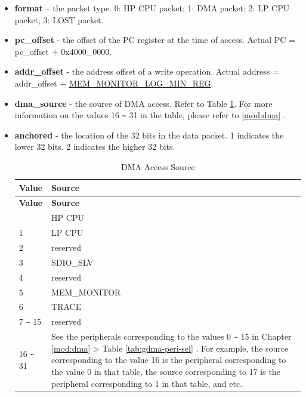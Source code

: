 \documentclass[main\_\_EN.tex]{subfiles}
\begin{document}
\begin{itemize}
    \item {\bfseries format} – the packet type. 0: HP CPU packet; 1: DMA packet; 2: LP CPU packet; 3: LOST packet.
    \item {\bfseries pc\_offset} - the offset of the PC register at the time of access. Actual PC = pc\_offset + 0x4000\_0000.
    \item {\bfseries addr\_offset} - the address offset of a write operation. Actual address = addr\_offset + \hyperref[regdesc:MEMMONITORLOGMINREG]{MEM\_MONITOR\_LOG\_MIN\_REG}.
    \item {\bfseries dma\_source} - the source of DMA access. Refer to Table \ref{tab:dma_source}. For more information on the values 16 \verb+~+ 31 in the table, please refer to \ref{mod:dma} \textit{}.
    \item {\bfseries anchored} - the location of the 32 bits in the data packet. 1 indicates the lower 32 bits. 2 indicates the higher 32 bits.
    
        \begin{longtable}[c]{|l|m{8cm}|}
        \caption{DMA Access Source}\label{tab:dma_source}
        \\\hline
        \rowcolor{lightgray}
        {\bfseries Value} & {\bfseries Source} \\\hline
        \endfirsthead \hline \rowcolor{lightgray}
        {\bfseries Value} & {\bfseries Source} \\\hline
        \endhead \endfoot \hline \endlastfoot
        0 & HP CPU \\\hline
        1 & LP CPU \\\hline
        2 & reserved \\\hline
        3 & SDIO\_SLV \\\hline
        4 & reserved \\\hline
        5 & MEM\_MONITOR \\\hline
        6 & TRACE \\\hline 
        7 \verb+~+ 15 & reserved \\\hline
        16 \verb+~+ 31 & See the peripherals corresponding to the values 0 \verb+~+ 15 in Chapter \ref{mod:dma} \textit{\nameref{mod:dma}} > Table \ref{tab:gdma-peri-sel} \textit{\nameref{tab:gdma-peri-sel}}. For example, the source corresponding to the value 16 is the peripheral corresponding to the value 0 in that table, the source corresponding to 17 is the peripheral corresponding to 1 in that table, and etc.\\\hline
        \end{longtable}
\end{itemize}    
\end{document}
